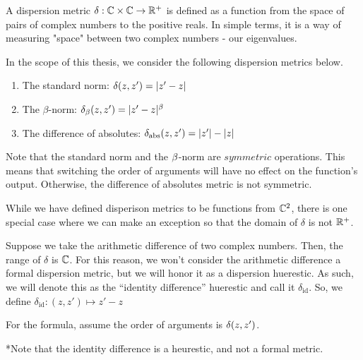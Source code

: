 \begin{definition}
A dispersion metric $\delta: \mathbb{C} \times \mathbb{C} \to \mathbb{R}^+$ is defined as a function from the space of pairs of complex numbers to the positive reals. In simple terms, it is a way of measuring "space" between two complex numbers - our eigenvalues.
\end{definition}

In the scope of this thesis, we consider the following dispersion metrics below.

\begin{enumerate}
\item The standard norm: $\delta(z,z') = |z' - z|$
\item The $\beta$-norm: $\delta_\beta(z,z') = |z' - z|^\beta$
\item The difference of absolutes: $\delta_{\text{abs}}(z,z') = |z'| - |z|$
\end{enumerate}

\begin{remark}
Note that the standard norm and the $\beta$-norm are $\textit{symmetric}$ operations. This means that switching the order of arguments will have no effect on the function's output. Otherwise, the difference of absolutes metric is not symmetric.
\end{remark}

While we have defined disperison metrics to be functions from $\mathbb{C}^2$, there is one special case where we can make an exception so that the domain of $\delta$ is not $\mathbb{R}^+$.

\begin{remark}
Suppose we take the arithmetic difference of two complex numbers. Then, the range of $\delta$ is $\mathbb{C}$. For this reason, we won't consider the arithmetic difference a formal dispersion metric, but we will honor it as a dispersion huerestic. As such, we will denote this as the ``identity difference'' huerestic and call it $\delta_{\text{id}}$. So, we define $\delta_{\text{id}}: (z, z') \mapsto z' - z$
\end{remark}

For the formula, assume the order of arguments is $\delta(z, z')$. \newline
\dispersiontable
\vspace{1em}

*Note that the identity difference is a heurestic, and not a formal metric.

\newpage

